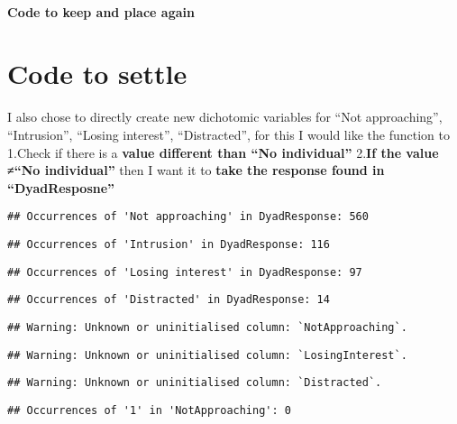 \documentclass[
]{article}
\begin{document}
\hypertarget{code-to-keep-and-place-again}{%
\paragraph{Code to keep and place
again}\label{code-to-keep-and-place-again}}

\hypertarget{code-to-settle}{%
\section{Code to settle}\label{code-to-settle}}

I also chose to directly create new dichotomic variables for ``Not
approaching'', ``Intrusion'', ``Losing interest'', ``Distracted'', for
this I would like the function to 1.Check if there is a \textbf{value
different than ``No individual''} 2.\textbf{If the value ≠``No
individual''} then I want it to \textbf{take the response found in
``DyadResposne''}

\begin{verbatim}
## Occurrences of 'Not approaching' in DyadResponse: 560
\end{verbatim}

\begin{verbatim}
## Occurrences of 'Intrusion' in DyadResponse: 116
\end{verbatim}

\begin{verbatim}
## Occurrences of 'Losing interest' in DyadResponse: 97
\end{verbatim}

\begin{verbatim}
## Occurrences of 'Distracted' in DyadResponse: 14
\end{verbatim}

\begin{verbatim}
## Warning: Unknown or uninitialised column: `NotApproaching`.
\end{verbatim}

\begin{verbatim}
## Warning: Unknown or uninitialised column: `LosingInterest`.
\end{verbatim}

\begin{verbatim}
## Warning: Unknown or uninitialised column: `Distracted`.
\end{verbatim}

\begin{verbatim}
## Occurrences of '1' in 'NotApproaching': 0
\end{verbatim}
\end{document}
